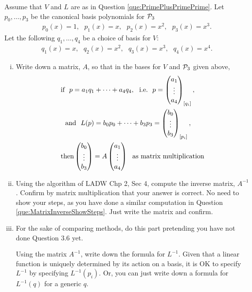 \begin{question}
    \normalfont

    Assume that $V$ and $L$ are as in Question \ref{que:PrimePlusPrimePrime}. Let $p_0,\dots, p_3$ be the canonical basis polynomials for $\P_3$
    \begin{align*}
        p_0(x) = 1,\ \ \
        p_1(x) = x,\ \ \
        p_2(x) = x^2,\ \ \
        p_3(x) = x^3.
    \end{align*}
    Let the following $q_1,\dots, q_4$ be a choice of basis for $V$:
    \begin{align*}
        q_1(x) = x,\ \ \
        q_2(x) = x^2,\ \ \
        q_3(x) = x^3,\ \ \
        q_4(x) = x^4.
    \end{align*}

    \begin{enumerate}[(i)]
        \item Write down a matrix, $A$, so that in the bases for $V$ and $\P_3$ given above,
              \begin{align*}
                   & \text{if}\ \
                  p = a_1q_1+ \cdots + a_4 q_4,\ \ \text{i.e.}\ \ p=\ColVecThree{a_1}{\vdots}{a_4}_{[q_i]}, \\
                   & \ \ \text{and}\ \
                  L(p) = b_0p_0 + \cdots + b_3p_3 = \ColVecThree{b_0}{\vdots}{b_3}_{[p_i]},                 \\
                   & \text{then}
                  \ColVecThree{b_0}{\vdots}{b_3}
                  = A\ColVecThree{a_1}{\vdots}{a_4}\ \ \text{as matrix multiplication}
              \end{align*}

        \item Using the algorithm of LADW Chp 2, Sec 4, compute the inverse matrix, $A^{-1}$.  Confirm by matrix multiplication that your answer is correct.  No need to show your steps, as you have done a similar computation in Question \ref{que:MatrixInverseShowSteps}.  Just write the matrix and confirm.

        \item  For the sake of comparing methods, do this part pretending you have not done Question 3.6 yet.


              Using the matrix $A^{-1}$, write down the formula for $L^{-1}$.  Given that a linear function is uniquely determined by its action on a basis, it is OK to specify $L^{-1}$ by specifying $L^{-1}(p_i)$.  Or, you can just write down a formula for $L^{-1}(q)$ for a generic $q$.
    \end{enumerate}
\end{question}

